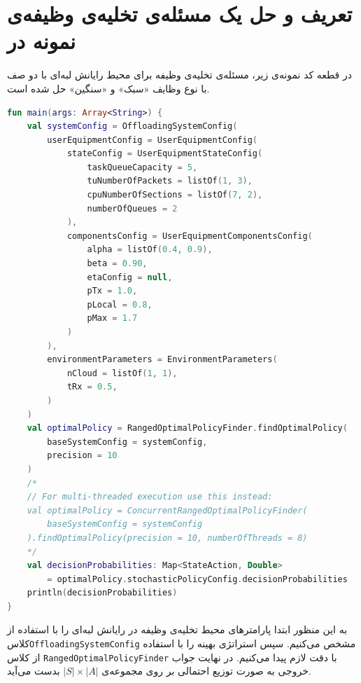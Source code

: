 \section{تعریف و حل یک مسئله‌ی تخلیه‌ی وظیفه‌ی نمونه در }
در قطعه کد نمونه‌ی زیر، مسئله‌ی تخلیه‌ی وظیفه‌ برای محیط رایانش لبه‌ای با دو صف با نوع وظایف «سبک» و «سنگین» حل شده است.
\begin{LTR}
	\begin{lstlisting}[language=Kotlin, caption={تعریف و حل مسئله‌ی نمونه}, captiondirection=RTL, label={lst:solve}]
fun main(args: Array<String>) {
	val systemConfig = OffloadingSystemConfig(
		userEquipmentConfig = UserEquipmentConfig(
			stateConfig = UserEquipmentStateConfig(
				taskQueueCapacity = 5,
				tuNumberOfPackets = listOf(1, 3),
				cpuNumberOfSections = listOf(7, 2),
				numberOfQueues = 2
			),
			componentsConfig = UserEquipmentComponentsConfig(
				alpha = listOf(0.4, 0.9),
				beta = 0.90,
				etaConfig = null,
				pTx = 1.0,
				pLocal = 0.8,
				pMax = 1.7
			)
		),
		environmentParameters = EnvironmentParameters(
			nCloud = listOf(1, 1),
			tRx = 0.5,
		)
	)
	val optimalPolicy = RangedOptimalPolicyFinder.findOptimalPolicy(
		baseSystemConfig = systemConfig, 
		precision = 10
	)
	/*
	// For multi-threaded execution use this instead:
	val optimalPolicy = ConcurrentRangedOptimalPolicyFinder(
		baseSystemConfig = systemConfig
	).findOptimalPolicy(precision = 10, numberOfThreads = 8)
	*/
	val decisionProbabilities: Map<StateAction, Double>
		= optimalPolicy.stochasticPolicyConfig.decisionProbabilities
	println(decisionProbabilities)
}
	\end{lstlisting}
\end{LTR}
به این منظور ابتدا پارامترهای محیط تخلیه‌ی وظیفه در رایانش لبه‌ای را با استفاده از کلاس\linebreak \texttt{\footnotesize OffloadingSystemConfig} مشخص می‌کنیم. سپس استراتژی بهینه را با استفاده از کلاس \texttt{\footnotesize RangedOptimalPolicyFinder} با دقت لازم پیدا می‌کنیم. در نهایت جواب خروجی به صورت توزیع احتمالی بر روی مجموعه‌ی $|S| \times |A|$ بدست می‌آید.
\newpage
